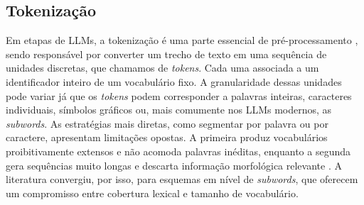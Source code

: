 \subsection{Tokenização} 

Em etapas de LLMs, a tokenização é uma parte essencial de pré-processamento \citep{webster1992tokenization}, sendo responsável por converter um trecho de texto em uma sequência de unidades discretas, que chamamos de \textit{tokens}. Cada uma associada a um identificador inteiro de um vocabulário fixo. A granularidade dessas unidades pode variar já que os
\textit{tokens} podem corresponder a palavras inteiras, caracteres individuais, símbolos gráficos ou, mais comumente nos LLMs modernos, as \textit{subwords}. As estratégias mais diretas, como segmentar por palavra ou por caractere, apresentam limitações opostas. A primeira produz vocabulários proibitivamente extensos e não acomoda palavras inéditas, enquanto a segunda gera sequências muito longas e descarta informação morfológica relevante \citep{sennrich2015bpe}. A literatura convergiu, por isso, para esquemas em nível de \textit{subwords}, que oferecem um compromisso entre cobertura lexical e tamanho de vocabulário.



